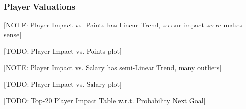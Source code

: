 \documentclass[]{article}
\begin{document}
%

\subsubsection{Player Valuations}

[NOTE: Player Impact vs. Points has Linear Trend, so our impact score makes sense]

[TODO: Player Impact vs. Points plot]

[NOTE: Player Impact vs. Salary has semi-Linear Trend, many outliers]

[TODO: Player Impact vs. Salary plot]

[TODO: Top-20 Player Impact Table w.r.t. Probability Next Goal]
\end{document}

